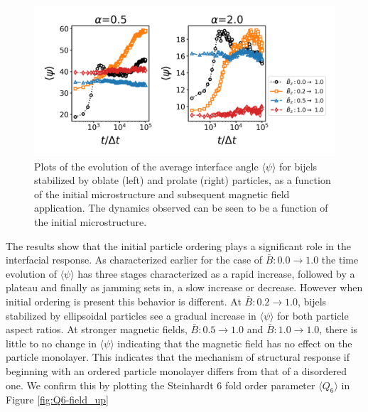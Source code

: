 \begin{figure} 
    \centering 
    \includegraphics[scale=0.4]{../figures/results/paper2/psi-field_up.png} 
    \caption{Plots of the evolution of the average interface angle \(\langle \psi \rangle\) for bijels stabilized 
             by oblate (left) and prolate (right) particles, as a function of the initial microstructure and subsequent magnetic field application.
             The dynamics observed can be seen to be a function of the initial microstructure.} 
    \label{fig:interface_angle-field_up} 
\end{figure}

The results show that the initial particle ordering plays a significant role in the interfacial response. As characterized earlier for the case of
$\bar{B}:0.0 \rightarrow 1.0$ the time evolution of $\langle \psi \rangle$ has three stages characterized as a rapid increase, followed by a plateau
and finally as jamming sets in, a slow increase or decrease. However when initial ordering is present this behavior is different. At 
$\bar{B}: 0.2 \rightarrow 1.0$, bijels stabilized by ellipsoidal particles see a gradual increase in $\langle \psi \rangle$ for both particle aspect ratios.
At stronger magnetic fields, $\bar{B}: 0.5 \rightarrow 1.0$ and $\bar{B}: 1.0 \rightarrow 1.0$, there is little to no change in $\langle \psi \rangle$ indicating
that the magnetic field has no effect on the particle monolayer. This indicates that the mechanism of structural response if beginning with an ordered particle
monolayer differs from that of a disordered one. We confirm this by plotting the Steinhardt 6 fold order parameter $\langle Q_6 \rangle$ in Figure \ref{fig:Q6-field_up}

